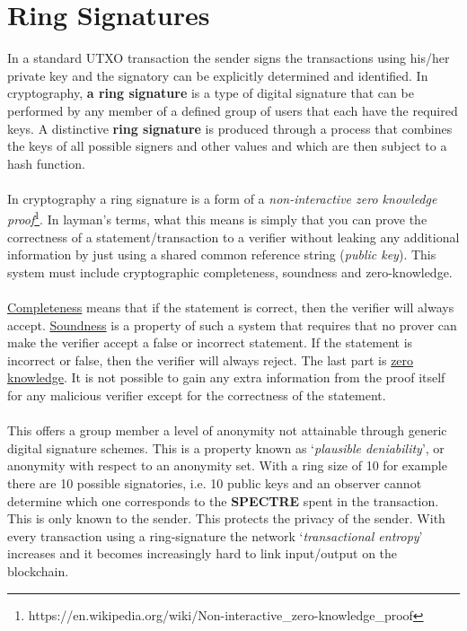 \section{Ring Signatures}
In a standard UTXO transaction the sender signs the transactions using his/her
private key and the signatory can be explicitly determined and identified. In
cryptography, \textbf{a ring signature} is a type of digital signature that can be
performed by any member of a defined group of users that each have the required
keys. A distinctive \textbf{ring signature} is produced through a process that combines
the keys of all possible signers and other values and which are then subject to
a hash function.
\\
\\
\noindent
In cryptography a ring signature is a form of a \textit{non-interactive 
zero knowledge proof}\footnote{https://en.wikipedia.org/wiki/Non-interactive\_zero-knowledge\_proof}. 
In layman’s terms, what this means is simply that you can prove the
correctness of a statement/transaction to a verifier without leaking any additional
information by just using a shared common reference string (\textit{public key}).
This system must include cryptographic completeness, soundness and zero-knowledge.
\\
\\
\noindent
\underline{Completeness} means that if the statement is correct, then the verifier will
always accept. \underline{Soundness} is a property of such a system that requires that
no prover can make the verifier accept a false or incorrect statement. If the
statement is incorrect or false, then the verifier will always reject. The
last part is \underline{zero knowledge}. It is not possible to gain any extra information
from the proof itself for any malicious verifier except for the correctness of
the statement.
\\
\\
\noindent
This offers a group member a level of anonymity not attainable through generic
digital signature schemes. This is a property known as ‘\textit{plausible deniability}’,
or anonymity with respect to an anonymity set. With a ring size of 10 for example
there are 10 possible signatories, i.e. 10 public keys and an observer cannot
determine which one corresponds to the \textbf{SPECTRE} spent in the transaction. This
is only known to the sender. This protects the privacy of the sender. With every
transaction using a ring-signature the network ‘\textit{transactional entropy}’ increases
and it becomes increasingly hard to link input/output on the blockchain.
